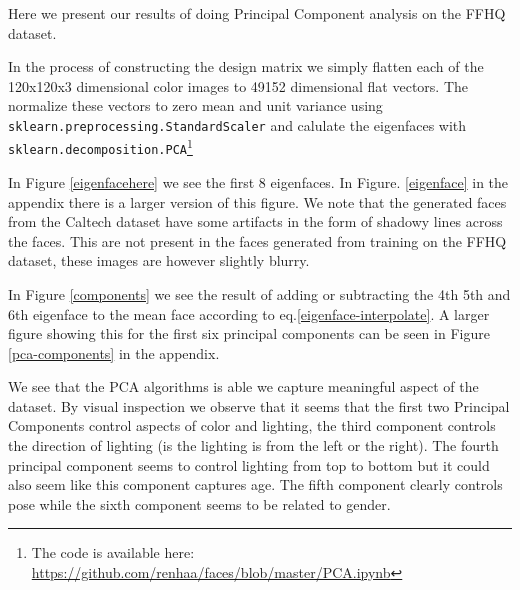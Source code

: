 Here we present our results of doing Principal Component analysis on the FFHQ dataset.

In the process of constructing the design matrix we simply flatten each of the 120x120x3 dimensional color images to 49152 dimensional flat vectors. The normalize these vectors to zero mean and unit variance using\\ {\tt sklearn.preprocessing.StandardScaler} and calulate the eigenfaces with {\tt sklearn.decomposition.PCA}\footnote{The code is available here: \url{https://github.com/renhaa/faces/blob/master/PCA.ipynb}}

In Figure \ref{eigenfacehere} we see the first 8 eigenfaces. In Figure. \ref{eigenface} in the appendix there is a larger version of this figure. We note that the generated faces from the Caltech dataset have some artifacts in the form of shadowy lines across the faces. This are not present in the faces generated from training on the FFHQ dataset, these images are however slightly blurry.

In Figure \ref{components} we see the result of adding or subtracting the 4th 5th and 6th eigenface to the mean face according to eq.\ref{eigenface-interpolate}. A larger figure showing this for the first six principal components can be seen in Figure \ref{pca-components} in the appendix.

We see that the PCA algorithms is able we capture meaningful aspect of the dataset.
By visual inspection we observe that it seems that the first two Principal Components control aspects of color and lighting, the third component controls the direction of lighting (is the lighting is from the left or the right). The fourth principal component seems to control lighting from top to bottom but it could also seem like this component captures age. The fifth component clearly controls pose while the sixth component seems to be related to gender.

